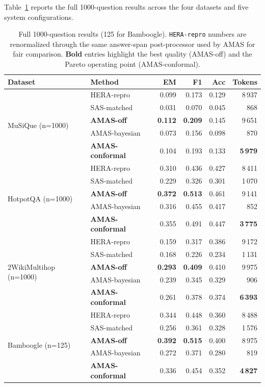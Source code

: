 \documentclass[11pt]{article}
\newcommand{\amas}{AMAS\xspace}
\begin{document}
Table~\ref{tab:headline} reports the full 1000-question results across
the four datasets and five system configurations.

\begin{table}[H]
\centering
\small
\begin{tabular}{llrrrr}
\toprule
\textbf{Dataset} & \textbf{Method} & \textbf{EM} & \textbf{F1} & \textbf{Acc} & \textbf{Tokens} \\
\midrule
\multirow{5}{*}{MuSiQue (n=1000)}
 & HERA-repro       & 0.099 & 0.173 & 0.129 & 8\,937 \\
 & SAS-matched      & 0.031 & 0.070 & 0.045 & \phantom{0}\phantom{0}868 \\
 & \textbf{AMAS-off}        & \textbf{0.112} & \textbf{0.209} & 0.145 & 9\,651 \\
 & AMAS-bayesian    & 0.073 & 0.156 & 0.098 & \phantom{0}\phantom{0}870 \\
 & \textbf{AMAS-conformal}  & 0.104 & 0.193 & 0.133 & \textbf{5\,979} \\
\midrule
\multirow{5}{*}{HotpotQA (n=1000)}
 & HERA-repro       & 0.310 & 0.436 & 0.427 & 8\,411 \\
 & SAS-matched      & 0.229 & 0.326 & 0.301 & 1\,070 \\
 & \textbf{AMAS-off}        & \textbf{0.372} & \textbf{0.513} & 0.461 & 9\,141 \\
 & AMAS-bayesian    & 0.316 & 0.455 & 0.417 & \phantom{0}\phantom{0}852 \\
 & \textbf{AMAS-conformal}  & 0.355 & 0.491 & 0.447 & \textbf{3\,775} \\
\midrule
\multirow{5}{*}{2WikiMultihop (n=1000)}
 & HERA-repro       & 0.159 & 0.317 & 0.386 & 9\,172 \\
 & SAS-matched      & 0.168 & 0.226 & 0.234 & 1\,131 \\
 & \textbf{AMAS-off}        & \textbf{0.293} & \textbf{0.409} & 0.410 & 9\,975 \\
 & AMAS-bayesian    & 0.239 & 0.345 & 0.329 & \phantom{0}\phantom{0}906 \\
 & \textbf{AMAS-conformal}  & 0.261 & 0.378 & 0.374 & \textbf{6\,393} \\
\midrule
\multirow{5}{*}{Bamboogle (n=125)}
 & HERA-repro       & 0.344 & 0.448 & 0.360 & 8\,488 \\
 & SAS-matched      & 0.256 & 0.361 & 0.328 & 1\,576 \\
 & \textbf{AMAS-off}        & \textbf{0.392} & \textbf{0.515} & 0.400 & 8\,975 \\
 & AMAS-bayesian    & 0.272 & 0.371 & 0.280 & \phantom{0}\phantom{0}819 \\
 & \textbf{AMAS-conformal}  & 0.336 & 0.454 & 0.352 & \textbf{4\,827} \\
\bottomrule
\end{tabular}
\caption{Full 1000-question results (125 for Bamboogle). \texttt{HERA-repro}
numbers are renormalized through the same answer-span post-processor used
by \amas for fair comparison. \textbf{Bold} entries highlight the best
quality (\amas-off) and the Pareto operating point (\amas-conformal).}
\label{tab:headline}
\end{table}
\end{document}

